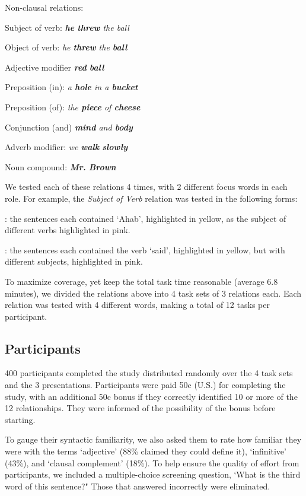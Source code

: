 Non-clausal relations:
\squishlist
	\item Subject of verb: \emph{\textbf{he} \textbf{threw} the ball}
	\item Object of verb:  \emph{ he \textbf{threw} the \textbf{ball}}
	\item Adjective modifier \emph{\textbf{red} \textbf{ball}}
	\item Preposition (in): \emph{a \textbf{hole} in a \textbf{bucket}}
	\item Preposition (of):  \emph{ the \textbf{piece} of \textbf{cheese}}
	\item Conjunction (and)  \emph{ \textbf{mind} and \textbf{body}}
	\item Adverb modifier: \emph{  we \textbf{walk} \textbf{slowly}}
	\item Noun compound:  \emph{ \textbf{Mr.}  \textbf{Brown}}
\squishend

We tested each of these relations 4 times, with 2 different focus words in each role. For example, the \emph{Subject of Verb} relation  was tested in the following forms:
\squishlist
	\item {}:  the sentences each contained `Ahab', highlighted in yellow, as the subject of different verbs highlighted in pink.
	\item {}

	\item {}: the sentences each contained the verb `said', highlighted in yellow, but with different subjects, highlighted in pink.
	\item {}
\squishend

To maximize coverage, yet keep the total task time reasonable (average 6.8 minutes), we divided the relations above into 4 task sets of 3 relations each. Each relation was tested with 4 different words, making a total of 12 tasks per participant.

\subsection{Participants}
400 participants completed the study distributed randomly over the 4 task sets and the 3 presentations. Participants were paid 50c (U.S.) for completing the study, with an additional 50c bonus if they correctly identified 10 or more of the 12 relationships. They were informed of the possibility of the bonus before starting.

 To gauge their syntactic familiarity, we also asked them to rate how familiar they were with the terms `adjective' (88\% claimed they could define it), `infinitive' (43\%), and `clausal complement' (18\%). To help ensure the quality of effort from participants, we included a multiple-choice screening question, `What is the third word of this sentence?"  Those that answered incorrectly were eliminated.

